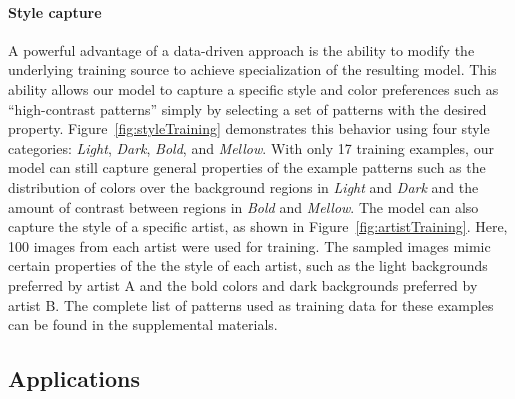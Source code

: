 \paragraph{Style capture} A powerful advantage of a data-driven approach is the ability to modify the underlying training source to achieve specialization of the resulting model. This ability allows our model to capture a specific style and color preferences such as ``high-contrast patterns'' simply by selecting a set of patterns with the desired property. Figure~\ref{fig:styleTraining} demonstrates this behavior using four style categories: \emph{Light}, \emph{Dark}, \emph{Bold}, and \emph{Mellow}. With only 17 training examples, our model can still capture general properties of the example patterns such as the distribution of colors over the background regions in \emph{Light} and \emph{Dark} and the amount of contrast between regions in \emph{Bold} and \emph{Mellow}. The model can also capture the style of a specific artist, as shown in Figure~\ref{fig:artistTraining}. Here, 100 images from each artist were used for training. The sampled images mimic certain properties of the the style of each artist, such as the light backgrounds preferred by artist A and the bold colors and dark backgrounds preferred by artist B. The complete list of patterns used as training data for these examples can be found in the supplemental materials.

\subsection{Applications}


